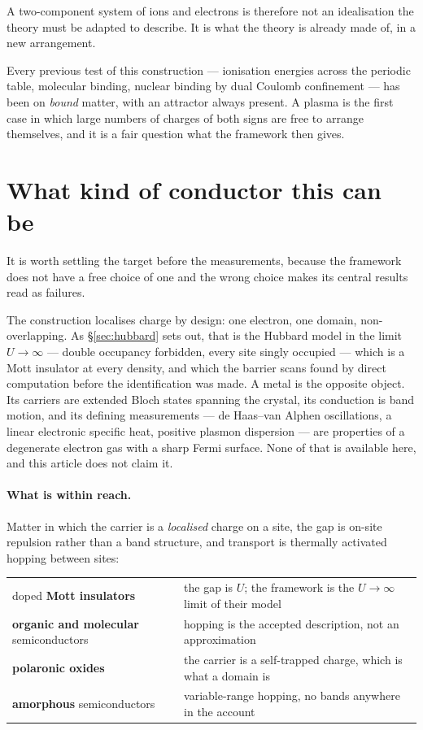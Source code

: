 \documentclass[11pt]{article}
\begin{document}
A two-component system of ions and electrons is therefore not an idealisation the theory must be
adapted to describe. It is what the theory is already made of, in a new arrangement.

Every previous test of this construction --- ionisation energies across the periodic table, molecular
binding, nuclear binding by dual Coulomb confinement \cite{realnucleus} --- has been on \emph{bound}
matter, with an attractor always present. A plasma is the first case in which large numbers of
charges of both signs are free to arrange themselves, and it is a fair question what the framework
then gives.

\section{What kind of conductor this can be}\label{sec:scope}

It is worth settling the target before the measurements, because the framework does not have a free
choice of one and the wrong choice makes its central results read as failures.

The construction localises charge by design: one electron, one domain, non-overlapping. As
\S\ref{sec:hubbard} sets out, that is the Hubbard model in the limit $U\to\infty$ --- double
occupancy forbidden, every site singly occupied --- which is a Mott insulator at every density, and
which the barrier scans found by direct computation before the identification was made. A metal is
the opposite object. Its carriers are extended Bloch states spanning the crystal, its conduction is
band motion, and its defining measurements --- de Haas--van Alphen oscillations, a linear electronic
specific heat, positive plasmon dispersion --- are properties of a degenerate electron gas with a
sharp Fermi surface. None of that is available here, and this article does not claim it.

\paragraph{What is within reach.} Matter in which the carrier is a \emph{localised} charge on a site,
the gap is on-site repulsion rather than a band structure, and transport is thermally activated
hopping between sites:

\begin{center}
\small
\begin{tabular}{@{}ll@{}}
\toprule
doped \textbf{Mott insulators} & the gap is $U$; the framework is the $U\to\infty$ limit of their model\\
\textbf{organic and molecular} semiconductors & hopping is the accepted description, not an approximation\\
\textbf{polaronic oxides} & the carrier is a self-trapped charge, which is what a domain is\\
\textbf{amorphous} semiconductors & variable-range hopping, no bands anywhere in the account\\
\bottomrule
\end{tabular}
\end{center}
\end{document}

